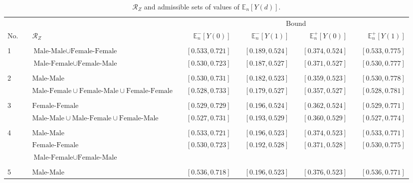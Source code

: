 \documentclass[12pt,a4paper,twoside]{article}
\renewcommand{\baselinestretch}{1.5}
\numberwithin{equation}{section}
\begin{document}
\clearpage
\renewcommand{\baselinestretch}{1}
\begin{sidewaystable}[p]
\centering
\caption{$\mathcal{R}_Z$ and admissible sets of values of $\mathbb{E}_n[Y(d)]$.}
\begin{tabular}{lclcrcrcrcr}
\toprule
&	& &	& \multicolumn{7}{c}{Bound} \\
\cmidrule(r){4-11}	
No. & &	$\mathcal{R}_Z$	&	&	$\mathbb{E}_n^-[Y(0)]$	&	&	$\mathbb{E}_n^-[Y(1)]$	&	&	$\mathbb{E}_n^+[Y(0)]$	&	&	$\mathbb{E}_n^+[Y(1)]$\\
\midrule
& &\phantom{$\text{Male-Female}\cup\text{Female-Male}\cup\text{Female-Female}$}\\
1& & $\text{Male-Male}\cup\text{Female-Female}$	&	&	$[0.533,0.721]$	&	&	$[0.189,0.524]$	&	&	$[0.374,0.524]$	&	&	$[0.533,0.775]$
\\
& &$\text{Male-Female}\cup\text{Female-Male}$	&	&	\color{blue}$[0.530,0.723]$	&	&	\color{blue}$[0.187,0.527]$	&	&	\color{blue}$[0.371,0.527]$	&	&	\color{blue}$[0.530,0.777]$\\
\\
2 & &$\text{Male-Male}$	&	&	$[0.530,0.731]$	&	&	$[0.182,0.523]$	&	&	$[0.359,0.523]$	&	&	$[0.530,0.778]$
\\
& &$\text{Male-Female}\cup\text{Female-Male}\cup\text{Female-Female}$	&	&	\color{blue}$[0.528,0.733]$	&	&	\color{blue}$[0.179,0.527]$	&	&	\color{blue}$[0.357,0.527]$	&	&	\color{blue}$[0.528,0.781]$\\
\\
3 & &$\text{Female-Female}$	&	&	$[0.529,0.729]$	&	&	$[0.196,0.524]$	&	&	$[0.362,0.524]$	&	&	$[0.529,0.771]$
\\
& &$\text{Male-Male}\cup\text{Male-Female}\cup\text{Female-Male}$	& &\color{blue}$[0.527,0.731]$	&	&	\color{blue}$[0.193,0.529]$	&	&	\color{blue}$[0.360,0.529]$	&	&	\color{blue}$[0.527,0.774]$\\	
\\
4 & &$\text{Male-Male}$&	&	$[0.533,0.721]$	&	&	$[0.196,0.523]$	&	&	$[0.374,0.523]$	&	&	$[0.533,0.771]$
\\
& &$\text{Female-Female}$ & &\color{blue}$[0.530,0.723]$	&	&	\color{blue}$[0.192,0.528]$	&	&	\color{blue}$[0.371,0.528]$	&	&	\color{blue}$[0.530,0.775]$\\
& &$\text{Male-Female}\cup\text{Female-Male}$\\	
\\
5 & &$\text{Male-Male}$&	&	$[0.536,0.718]$	&	&	$[0.196,0.523]$	&	&	$[0.376,0.523]$	&	&	$[0.536,0.771]$

\end{tabular}
\end{sidewaystable}
\end{document}
